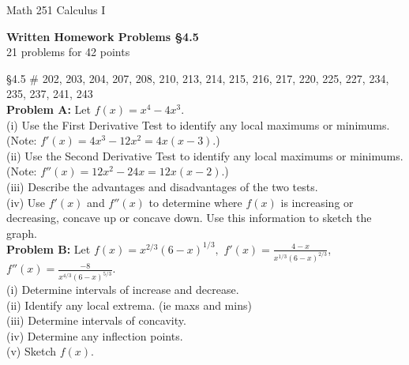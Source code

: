 \documentclass[11pt]{report}
\theoremstyle{plain}
\begin{document}
\hfill Math 251 Calculus I
\begin{center}
\Large{\textbf{Written Homework Problems \S 4.5}} \\
21 problems for 42 points\\
\end{center}

\begin{description}
\item{\S 4.5} \# 202, 203, 204, 207, 208, 210, 213, 214, 215, 216, 217, 220, 225, 227, 234, 235, 237, 241, 243\\

\textbf{Problem A:} Let $f(x)=x^4-4x^3.$\\
(i) Use the First Derivative Test to identify any local maximums or minimums. (Note: $f'(x)=4x^3-12x^2=4x(x-3).$)\\
(ii) Use the Second Derivative Test to identify any local maximums or minimums. (Note: $f''(x)=12x^2-24x=12x(x-2)$.)\\
(iii) Describe the advantages and disadvantages of the two tests.\\
(iv) Use $f'(x)$ and $f''(x)$ to determine where $f(x)$ is increasing or decreasing, concave up or concave down. Use this information to sketch the graph.\\


\textbf{Problem B:} Let $\displaystyle f(x)=x^{2/3}(6-x)^{1/3},$ $\displaystyle f'(x)= \frac{4-x}{x^{1/3}(6-x)^{2/3}}$, $\displaystyle  f''(x)=\frac{-8}{x^{4/3}(6-x)^{5/3}}.$\\
(i) Determine intervals of increase and decrease.\\
(ii) Identify any local extrema. (ie maxs and mins)\\
(iii) Determine intervals of concavity.\\
(iv) Determine any inflection points.\\
(v) Sketch $f(x).$\\

\end{description}
\end{document}
